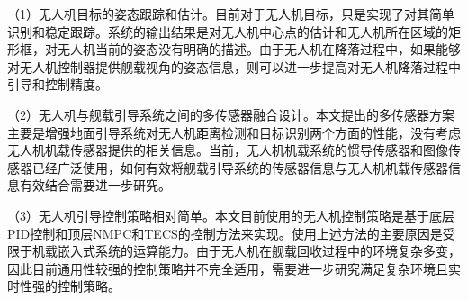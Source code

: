 （1）无人机目标的姿态跟踪和估计。目前对于无人机目标，只是实现了对其简单识别和稳定跟踪。系统的输出结果是对无人机中心点的估计和无人机所在区域的矩形框，对无人机当前的姿态没有明确的描述。由于无人机在降落过程中，如果能够对无人机控制器提供舰载视角的姿态信息，则可以进一步提高对无人机降落过程中引导和控制精度。

（2）无人机与舰载引导系统之间的多传感器融合设计。本文提出的多传感器方案主要是增强地面引导系统对无人机距离检测和目标识别两个方面的性能，没有考虑无人机机载传感器提供的相关信息。当前，无人机机载系统的惯导传感器和图像传感器已经广泛使用，如何有效将舰载引导系统的传感器信息与无人机机载传感器信息有效结合需要进一步研究。

（3）无人机引导控制策略相对简单。本文目前使用的无人机控制策略是基于底层PID控制和顶层NMPC和TECS的控制方法来实现。使用上述方法的主要原因是受限于机载嵌入式系统的运算能力。由于无人机在舰载回收过程中的环境复杂多变，因此目前通用性较强的控制策略并不完全适用，需要进一步研究满足复杂环境且实时性强的控制策略。